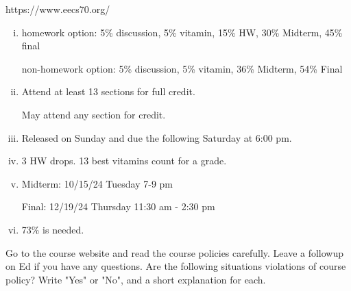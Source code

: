 \documentclass[11pt]{article}
\begin{document}
\begin{solution}
\begin{Parts}

\Part https://www.eecs70.org/

\Part 

\begin{enumerate}[(i)]  

\item homework option: 5\% discussion, 5\% vitamin, 15\% HW, 30\% Midterm, 45\% final

non-homework option: 5\% discussion, 5\% vitamin, 36\% Midterm, 54\% Final

\item Attend at least 13 sections for full credit.

May attend any section for credit.

\item Released on Sunday and due the following Saturday at 6:00 pm.

\item 3 HW drops. 13 best vitamins count for a grade.

\item Midterm: 10/15/24 Tuesday 7-9 pm

Final: 12/19/24 Thursday 11:30 am - 2:30 pm

\item 73\% is needed.
\end{enumerate}

\end{Parts}
\end{solution}


Go to the course website and read the course policies carefully. Leave a followup on Ed if you have any questions. Are the following situations violations of course policy? Write "Yes" or "No", and a short explanation for each.
\end{document}
